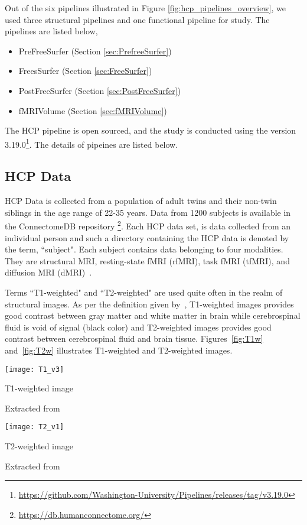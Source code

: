 Out of the six pipelines illustrated in Figure \ref{fig:hcp_pipelines_overview}, we used three structural pipelines and one functional pipeline for study. The pipelines are listed below, 
\begin{itemize}
  \item PreFreeSurfer (Section \ref{sec:PrefreeSurfer})
  \item FreesSurfer   (Section \ref{sec:FreeSurfer})
  \item PostFreeSurfer (Section \ref{sec:PostFreeSurfer})
  \item fMRIVolume    (Section \ref{sec:fMRIVolume})
\end{itemize}

The HCP pipeline is open sourced, and the study is conducted using the version 3.19.0\footnote{\url{https://github.com/Washington-University/Pipelines/releases/tag/v3.19.0}}. The details of pipeines are listed below.

\subsection{HCP Data}
HCP Data is collected from a population of adult twins and their non-twin siblings in the age range of 22-35 years. Data from 1200 subjects is available in the ConnectomeDB repository \footnote{\url{https://db.humanconnectome.org/}}. Each HCP data set, is data collected from an individual person and such a directory containing the HCP data is denoted by the term, ``subject". Each subject contains data belonging to four modalities. They are structural MRI, resting-state fMRI (rfMRI), task fMRI (tfMRI), and diffusion MRI (dMRI)~\cite{HCPData}.

Terms ``T1-weighted" and ``T2-weighted" are used quite often in the realm of structural images. As per the definition given by~\cite{t1w_t2w}, T1-weighted images provides good contrast between gray matter and white matter in brain while cerebrospinal fluid is void of signal (black color) and T2-weighted images provides good contrast between cerebrospinal fluid and brain tissue. Figures~\ref{fig:T1w} and~\ref{fig:T2w} illustrates T1-weighted and T2-weighted images.\\

\begin{center}
  \texttt{[image: T1\_v3]}
  \caption{T1-weighted image}
  \label{fig:T1w}
  \caption*{Extracted from \cite{t1w_t2w}}
\end{center}

\begin{center}
  \texttt{[image: T2\_v1]}
  \caption{T2-weighted image}
  \label{fig:T2w}
  \caption*{Extracted from \cite{t1w_t2w}}
\end{center}

